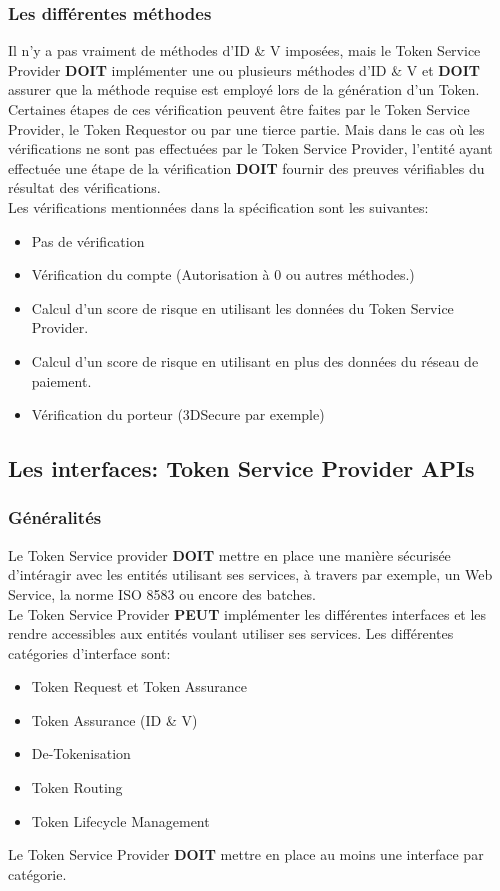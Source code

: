 \documentclass{report}
\begin{document}
\subsubsection{Les différentes méthodes}
Il n'y a pas vraiment de méthodes d'ID \& V imposées, mais le Token Service Provider \textbf{DOIT} implémenter une ou plusieurs méthodes d'ID \& V et \textbf{DOIT} assurer que la méthode requise est employé lors de la génération d'un Token. Certaines étapes de ces vérification peuvent être faites par le Token Service Provider, le Token Requestor ou par une tierce partie. Mais dans le cas où les vérifications ne sont pas effectuées par le Token Service Provider, l'entité ayant effectuée une étape de la vérification \textbf{DOIT} fournir des preuves vérifiables du résultat des vérifications.\\
Les vérifications mentionnées dans la spécification sont les suivantes:\\
\begin{itemize}
	\item Pas de vérification
	\item Vérification du compte (Autorisation à 0 ou autres méthodes.)
	\item Calcul d'un score de risque en utilisant les données du Token Service Provider.
	\item Calcul d'un score de risque en utilisant en plus des données du réseau de paiement.
	\item Vérification du porteur (3DSecure par exemple)
\end{itemize}


\subsection{Les interfaces: Token Service Provider APIs}
\subsubsection{Généralités}
Le Token Service provider \textbf{DOIT} mettre en place une manière sécurisée d'intéragir avec les entités utilisant ses services, à travers par exemple, un Web Service, la norme ISO 8583 ou encore des batches.\\
Le Token Service Provider \textbf{PEUT} implémenter les différentes interfaces et les rendre accessibles aux entités voulant utiliser ses services. Les différentes catégories d'interface sont:
\begin{itemize}
	\item Token Request et Token Assurance
	\item Token Assurance (ID \& V)
	\item De-Tokenisation
	\item Token Routing
	\item Token Lifecycle Management
\end{itemize}
\noindent
Le Token Service Provider \textbf{DOIT} mettre en place au moins une interface par catégorie.
\end{document}

